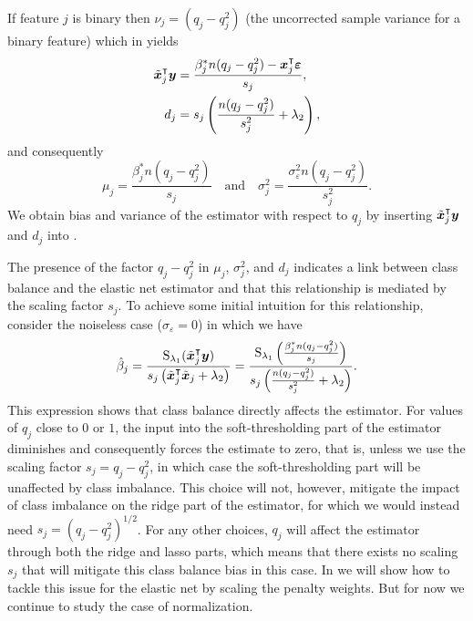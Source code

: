 If feature $j$ is binary then \(\nu_j = (q_j - q_j^2)\) (the uncorrected sample variance
for a binary feature) which in  yields
\begin{align*}
  \tilde{\boldsymbol{x}}_j^\intercal \boldsymbol{y} & = \frac{\beta_j^* n(q_j - q_j^2) - \boldsymbol{x}_j^\intercal \boldsymbol{\varepsilon}}{s_j}, \\
  d_j                          & = s_j \left(\frac{n(q_j - q_j^2)}{s_j^2} + \lambda_2\right),
\end{align*}
and consequently
\[
  \mu_j = \frac{\beta^*_j n(q_j - q_j^2)}{s_j}\quad \text{and} \quad \sigma_j^2 = \frac{\sigma_\varepsilon^2n(q_j- q_j^2)}{s^2_j}.
\]
%
We obtain bias and variance of the estimator with respect to \(q_j\) by inserting
\(\tilde{\boldsymbol{x}}_j^\intercal \boldsymbol{y}\) and \(d_j\) into .

The presence of the factor \(q_j - q_j^2\) in \(\mu_j\), \(\sigma_j^2\), and \(d_j\)
indicates a link between class balance and the elastic net estimator and that this
relationship is mediated by the scaling factor \(s_j\). To achieve some initial intuition
for this relationship, consider the noiseless case (\(\sigma_\varepsilon = 0\)) in which we
have
\begin{equation}
  \label{eq:noiseless-estimator}
  \hat{\beta}_j = \frac{\operatorname{S}_{\lambda_1}(\tilde{\boldsymbol{x}}_j^\intercal \boldsymbol{y})}{s_j\left(\tilde{\boldsymbol{x}}_j^\intercal \tilde{\boldsymbol{x}}_j + \lambda_2\right)}
  =
  \frac{\operatorname{S}_{\lambda_1}\left(\frac{\beta_j^* n (q_j - q_j^2)}{s_j}\right)}{s_j\left(\frac{n(q_j - q_j^2)}{s_j^2} + \lambda_2\right)}.
\end{equation}
%
This expression shows that class balance directly affects the estimator. For values of
\(q_j\) close to \(0\) or \(1\), the input into the soft-thresholding part of the estimator
diminishes and consequently forces the estimate to zero, that is, unless we use the scaling
factor \(s_j = q_j - q_j^2\), in which case the soft-thresholding part will be unaffected
by class imbalance. This choice will not, however, mitigate the impact of class imbalance
on the ridge part of the estimator, for which we would instead need \(s_j = (q_j -
q_j^2)^{1/2}\). For any other choices, \(q_j\) will affect the estimator through both the
ridge and lasso parts, which means that there exists no scaling \(s_j\) that will mitigate
this class balance bias in this case. In  we will show how to
tackle this issue for the elastic net by scaling the penalty weights. But for now we
continue to study the case of normalization.

